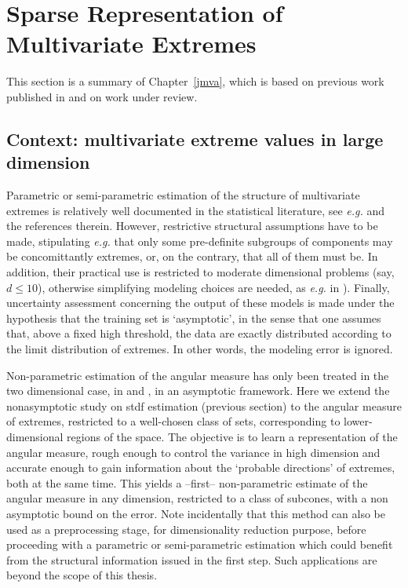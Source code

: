 \section{Sparse Representation of Multivariate Extremes}
\label{resume:sec:JMVA}
This section is a summary of Chapter~\ref{jmva}, which is based on previous work published in \cite{AISTAT16} and on work \cite{ARXIV16} under review.
\subsection{Context: multivariate extreme values in large dimension}
\label{context}

Parametric or semi-parametric estimation of the structure of multivariate extremes is relatively well documented in the statistical literature, see  \emph{e.g.} \cite{coles1991modeling,fougeres2009models,cooley2010pairwise,sabourinNaveau2012} and the references therein. However, restrictive structural assumptions have to be made, stipulating \emph{e.g.} that only some pre-definite subgroups of components may be concomittantly extremes, or, on the contrary, that all of them must be. In addition, their practical use is restricted to moderate dimensional problems (say, $d\le 10$), otherwise simplifying modeling choices are needed, as \emph{e.g.} in \cite{stephenson2009high}). Finally, uncertainty assessment concerning the output of these models is made under the hypothesis that the training set is `asymptotic', in the sense that one assumes that, above a fixed high threshold, the data are exactly distributed according to the limit distribution of extremes. In other words, the modeling error is ignored. 

Non-parametric estimation of the angular measure has only been treated in the two dimensional case, in \cite{Einmahl2001} and \cite{Einmahl2009}, in an asymptotic framework. Here we extend the nonasymptotic study on {\sc stdf} estimation (previous section) to the angular measure of extremes, restricted to a well-chosen class of sets, corresponding to lower-dimensional regions of the space. The objective is to learn a representation of the angular measure, rough enough to control the variance in high dimension and accurate enough to gain information about the `probable directions' of extremes, both at the same time. This yields a --first-- non-parametric estimate of the angular measure in any dimension, restricted to a class of subcones, %
with a non asymptotic bound on the error. 
Note incidentally that this method can also be used as a preprocessing stage, for dimensionality reduction purpose, before proceeding with a parametric or semi-parametric estimation which could benefit from the structural information issued in the first step. Such applications are beyond the scope of this thesis.

